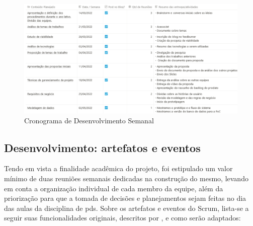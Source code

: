 \begin{figure}[htb]
\centering
\caption{Cronograma de Desenvolvimento Semanal}
\label{cronograma_desenvolvimento}
\includegraphics[width=1.0\textwidth]{anexos/Imagens_proposta/cronograma_desenvolvimento.png}
\end{figure}
\FloatBarrier

\subsection{Desenvolvimento: artefatos e eventos}

Tendo em vista a finalidade acadêmica do projeto, foi estipulado um valor mínimo de duas reuniões semanais dedicadas na construção do mesmo, levando em conta a organização individual de cada membro da equipe, além da priorização para que a tomada de decisões e planejamentos sejam feitas no dia das aulas da disciplina de \acs{pds}. Sobre os artefatos e eventos do Scrum, lista-se a seguir suas funcionalidades originais, descritos por , e como serão adaptados:

